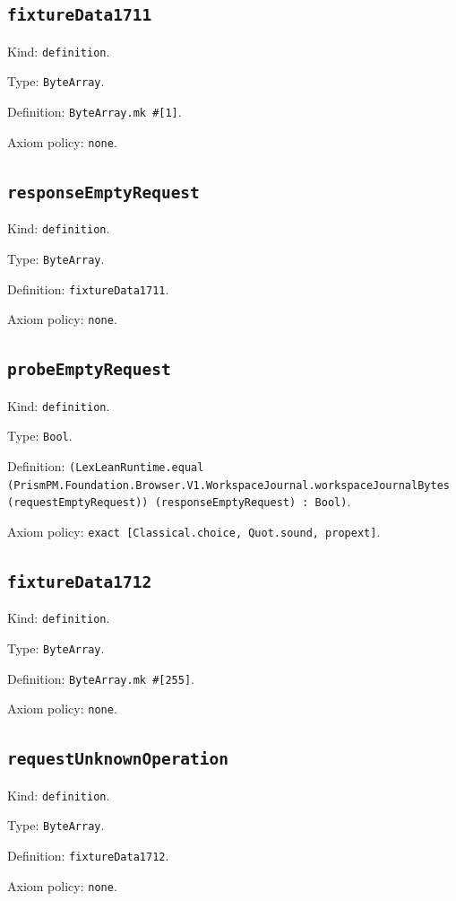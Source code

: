 \documentclass[11pt]{article}
\begin{document}
\subsection*{\texttt{fixtureData1711}}
\noindent Kind: \texttt{definition}.\par
\noindent Type: \texttt{ByteArray}.\par
\noindent Definition: \texttt{ByteArray.mk \#[1]}.\par
\noindent Axiom policy: \texttt{none}.\par
\subsection*{\texttt{responseEmptyRequest}}
\noindent Kind: \texttt{definition}.\par
\noindent Type: \texttt{ByteArray}.\par
\noindent Definition: \texttt{fixtureData1711}.\par
\noindent Axiom policy: \texttt{none}.\par
\subsection*{\texttt{probeEmptyRequest}}
\noindent Kind: \texttt{definition}.\par
\noindent Type: \texttt{Bool}.\par
\noindent Definition: \texttt{(LexLeanRuntime.equal (PrismPM.Foundation.Browser.V1.WorkspaceJournal.workspaceJournalBytes (requestEmptyRequest)) (responseEmptyRequest) : Bool)}.\par
\noindent Axiom policy: \texttt{exact [Classical.choice, Quot.sound, propext]}.\par
\subsection*{\texttt{fixtureData1712}}
\noindent Kind: \texttt{definition}.\par
\noindent Type: \texttt{ByteArray}.\par
\noindent Definition: \texttt{ByteArray.mk \#[255]}.\par
\noindent Axiom policy: \texttt{none}.\par
\subsection*{\texttt{requestUnknownOperation}}
\noindent Kind: \texttt{definition}.\par
\noindent Type: \texttt{ByteArray}.\par
\noindent Definition: \texttt{fixtureData1712}.\par
\noindent Axiom policy: \texttt{none}.\par
\end{document}

